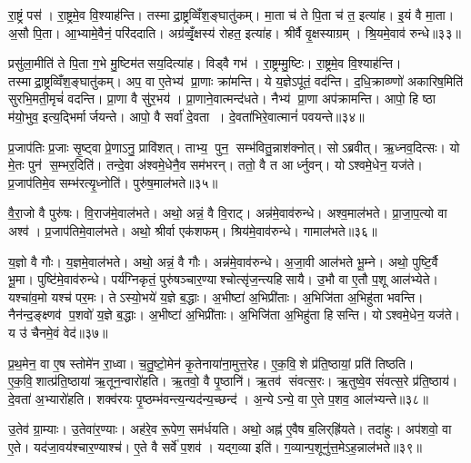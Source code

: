 रा॒ष्ट्रं पस॑। रा॒ष्ट्रमे॒व वि॒श्याह॑न्ति। तस्माद्रा॒ष्ट्रव्विँश॒ङ्घातु॑कम्। मा॒ता च॑ ते पि॒ता च॑ त॒ इत्या॑ह। इ॒यं वै मा॒ता। अ॒सौ पि॒ता। आ॒भ्यामे॒वैनं॒ परि॑ददाति। अग्र॑व्वृँ॒क्षस्य॑ रोहत॒ इत्या॑ह। श्रीर्वै वृ॒क्षस्याग्रम्। श्रि॒यमे॒वाव॑ रुन्धे॥३३॥

प्रसु॑ला॒मीति॑ ते पि॒ता ग॒भे मु॒ष्टिम॑तसय॒दित्या॑ह। विड्वै गभ॑। रा॒ष्ट्रम्मु॒ष्टिः। रा॒ष्ट्रमे॒व वि॒श्याह॑न्ति। तस्माद्रा॒ष्ट्रव्विँश॒ङ्घातु॑कम्। अप॒ वा ए॒तेभ्य॑ प्रा॒णाः क्रा॑मन्ति। ये य॒ज्ञेऽपू॑तं॒ वद॑न्ति। द॒धि॒क्राव्ण्णो॑ अकारिष॒मिति॑ सुरभि॒मती॒मृचं॑ वदन्ति। प्रा॒णा वै सु॑र॒भय॑। प्रा॒णाने॒वात्मन्द॑धते। नैभ्य॑ प्रा॒णा अप॑क्रामन्ति। आपो॒ हि ष्ठा म॑यो॒भुव॒ इत्य॒द्भिर्मार्जयन्ते। आपो॒ वै सर्वा॑ दे॒वता। दे॒वता॑भिरे॒वात्मानं॑ पवयन्ते॥३४॥\anuvakamend[रा॒ष्ट्रस्य॒ मध्यं॒ पुष्य॑ति॒ गभो॑ रुन्धे दधते च॒त्वारि॑ च]

प्र॒जाप॑तिः प्र॒जाः सृ॒ष्ट्वा प्रे॒णाऽनु॒ प्रावि॑शत्। ताभ्य॒ पुन॒ सम्भ॑वितु॒न्नाश॑क्नोत्। सोऽब्रवीत्। ऋ॒ध्नव॒दित्सः। यो मे॒तः पुन॑ स॒म्भर॒दिति॑। तन्दे॒वा अ॑श्वमे॒धेनै॒व सम॑भरन्। ततो॒ वै त आर्ध्नुवन्। योऽश्वमे॒धेन॒ यज॑ते। प्र॒जाप॑तिमे॒व सम्भ॑रत्यृ॒ध्नोति॑। पुरु॑ष॒माल॑भते॥३५॥

वै॒रा॒जो वै पुरु॑षः। वि॒राज॑मे॒वाल॑भते। अथो॒ अन्नं॒ वै वि॒राट्। अन्न॑मे॒वाव॑रुन्धे। अश्व॒माल॑भते। प्रा॒जा॒प॒त्यो वा अश्व॑। प्र॒जाप॑तिमे॒वाल॑भते। अथो॒ श्रीर्वा एक॑शफम्। श्रिय॑मे॒वाव॑रुन्धे। गामाल॑भते॥३६॥

य॒ज्ञो वै गौः। य॒ज्ञमे॒वाल॑भते। अथो॒ अन्नं॒ वै गौः। अन्न॑मे॒वाव॑रुन्धे। अ॒जा॒वी आल॑भते भू॒म्ने। अथो॒ पुष्टि॒र्वै भू॒मा। पुष्टि॑मे॒वाव॑रुन्धे। पर्य॑ग्निकृतं॒ पुरु॑षञ्चार॒ण्याश्चोत्सृ॑ज॒न्त्यहिसायै। उ॒भौ वा ए॒तौ प॒शू आल॑भ्येते। यश्चा॑व॒मो यश्च॑ पर॒मः। तेऽस्यो॒भये॑ य॒ज्ञे ब॒द्धाः। अ॒भीष्टा॑ अ॒भिप्री॑ताः। अ॒भिजि॑ता अ॒भिहु॑ता भवन्ति। नैन॑न्द॒ङ्क्ष्णव॑ प॒शवो॑ य॒ज्ञे ब॒द्धाः। अ॒भीष्टा॑ अ॒भिप्री॑ताः। अ॒भिजि॑ता अ॒भिहु॑ता हिसन्ति। योऽश्वमे॒धेन॒ यज॑ते। य उ॑ चैनमे॒वं वेद॑॥३७॥\anuvakamend[ल॒भ॒ते॒ गामाल॑भते पर॒मोऽष्टौ च॑]

प्र॒थ॒मेन॒ वा ए॒ष स्तोमे॑न रा॒ध्वा। च॒तु॒ष्टो॒मेन॑ कृ॒तेनाया॑ना॒मुत्त॒रेह\sn{}। ए॒क॒वि॒शे प्र॑ति॒ष्ठायां॒ प्रति॑ तिष्ठति। ए॒क॒वि॒शात्प्र॑ति॒ष्ठाया॑ ऋ॒तून॒न्वारो॑हति। ऋ॒तवो॒ वै पृ॒ष्ठानि॑। ऋ॒तव॑ संवत्स॒रः। ऋ॒तुष्वे॒व सं॑वत्स॒रे प्र॑ति॒ष्ठाय॑। दे॒वता॑ अ॒भ्यारो॑हति। शक्व॑रयः पृ॒ष्ठम्भ॑वन्त्य॒न्यद॑न्य॒च्छन्द॑। अ॒न्येऽन्ये॒ वा ए॒ते प॒शव॒ आल॑भ्यन्ते॥३८॥

उ॒तेव॑ ग्रा॒म्याः। उ॒तेवा॑र॒ण्याः। अह॑रे॒व रू॒पेण॒ सम॑र्धयति। अथो॒ अह्न॑ ए॒वैष ब॒लिर्‌ह्रि॑यते। तदा॑हुः। अप॑शवो॒ वा ए॒ते। यद॑जा॒वय॑श्चार॒ण्याश्च॑। ए॒ते वै सर्वे॑ प॒शव॑। यद्ग॒व्या इति॑। ग॒व्यान्प॒शूनु॑त्त॒मेऽह॒न्नाल॑भते॥३९॥

